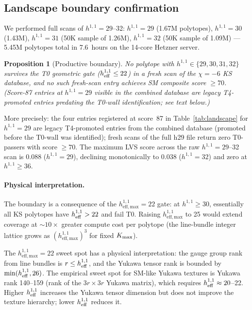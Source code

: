 \documentclass[11pt,a4paper]{article}
\newtheorem{proposition}{Proposition}
\newcommand{\hone}{h^{1,1}}
\newcommand{\effmax}{h^{1,1}_{\mathrm{eff,max}}}
\begin{document}
\subsection{Landscape boundary confirmation}
\label{sec:boundary}

We performed full scans of $h^{1,1} = 29$--32:
$h^{1,1}=29$ (1.67M polytopes), $h^{1,1}=30$ (1.43M),
$h^{1,1}=31$ (50K sample of 1.26M), $h^{1,1}=32$ (50K sample
of 1.09M) --- 5.45M polytopes total in 7.6~hours on the
14-core Hetzner server.

\begin{proposition}[Productive boundary]
\label{prop:boundary}
  No polytope with $h^{1,1} \in \{29,30,31,32\}$ survives the
  T0 geometric gate ($h^{1,1}_{\rm eff} \leq 22$) in a fresh scan
  of the $\chi=-6$ KS database, and no such fresh-scan entry achieves
  SM composite score $\geq 70$.  (Score-87 entries at $h^{1,1}=29$
  visible in the combined database are legacy T4-promoted
  entries predating the T0-wall identification; see text below.)
\end{proposition}

More precisely: the four entries registered at score~87 in
Table~\ref{tab:landscape} for $h^{1,1}=29$ are legacy
T4-promoted entries from the combined database (promoted before
the T0-wall was identified); fresh scans of the full h29 file
return zero T0-passers with score $\geq 70$.
The maximum LVS score across the raw $h^{1,1}=29$--32 scan
is 0.088 ($h^{1,1}=29$), declining monotonically to
0.038 ($h^{1,1}=32$) and zero at $h^{1,1}\geq 36$.

\paragraph{Physical interpretation.}
The boundary is a consequence of the $\effmax = 22$ gate:
at $h^{1,1} \geq 30$, essentially all KS polytopes have
$\hone_{\rm eff} > 22$ and fail T0.
Raising $\effmax$ to 25 would extend coverage at
$\sim 10\times$ greater compute cost per polytope
(the line-bundle integer lattice grows as $(\effmax)^3$
for fixed $K_{\rm max}$).

The $\effmax = 22$ sweet spot has a physical interpretation:
the gauge group rank from line bundles is $r \leq \hone_{\rm eff}$,
and the Yukawa tensor rank is bounded by $\min(\hone_{\rm eff}, 26)$.
The empirical sweet spot for SM-like Yukawa textures is
Yukawa rank 140--159 (rank of the $3r\times 3r$ Yukawa matrix),
which requires $\hone_{\rm eff} \approx 20$--22.
Higher $\hone_{\rm eff}$ increases the Yukawa tensor dimension
but does not improve the texture hierarchy; lower $\hone_{\rm eff}$
reduces it.
\end{document}
